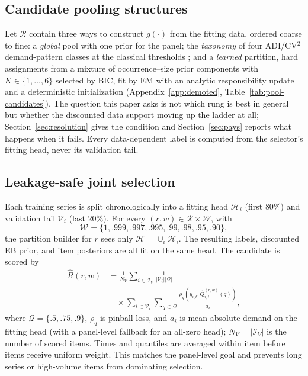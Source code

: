 \documentclass[twoside]{article}
\theoremstyle{definition}
\begin{document}
\subsection{Candidate pooling structures}\label{sec:mixture}

Let $\mathcal R$ contain three ways to construct $g(\cdot)$ from the
fitting data, ordered coarse to fine: a \emph{global} pool with one prior
for the panel; the \emph{taxonomy} of four ADI/CV$^2$ demand-pattern
classes at the classical thresholds \citep{syntetos2005categorization};
and a \emph{learned} partition, hard assignments from a mixture of
occurrence--size prior components with $K\in\{1,\dots,6\}$ selected by
BIC, fit by EM with an analytic responsibility update and a
deterministic initialization (Appendix~\ref{app:demoted},
Table~\ref{tab:pool-candidates}). The question this paper asks is not
which rung is best in general but whether the discounted data support
moving up the ladder at all; Section~\ref{sec:resolution} gives the
condition and Section~\ref{sec:pays} reports what happens when it fails.
Every data-dependent label is computed from the selector's fitting head,
never its validation tail.

\subsection{Leakage-safe joint selection}\label{sec:select}

Each training series is split chronologically into a fitting head
$\mathcal H_i$ (first $80\%$) and validation tail $\mathcal V_i$ (last
$20\%$). For every $(r,w)\in\mathcal R\times\mathcal W$, with
\[
\mathcal W=\{1,.999,.997,.995,.99,.98,.95,.90\},
\]
the partition builder for $r$ sees only $\mathcal H=\cup_i\mathcal H_i$.
The resulting labels, discounted EB prior, and item posteriors are all
fit on the same head. The candidate is scored by
\begin{equation}
\begin{aligned}
\widehat R(r,w)
&=\frac{1}{N_{\!V}}\sum_{i\in\mathcal I_V}
  \frac{1}{|\mathcal V_i||\mathcal Q|}\\[-0.25em]
&\quad\times
  \sum_{t\in\mathcal V_i}\sum_{q\in\mathcal Q}
  \frac{\rho_q(y_{i,t},\widehat Q_{i,t}^{(r,w)}(q))}{a_i},
\end{aligned}
\label{eq:selection-risk}
\end{equation}
where $\mathcal Q=\{.5,.75,.9\}$, $\rho_q$ is pinball loss, and $a_i$
is mean absolute demand on the fitting head (with a panel-level fallback
for an all-zero head); $N_V=|\mathcal I_V|$ is the number of scored
items. Times and quantiles are averaged within item
before items receive uniform weight. This matches the panel-level goal
and prevents long series or high-volume items from dominating selection.
\end{document}
